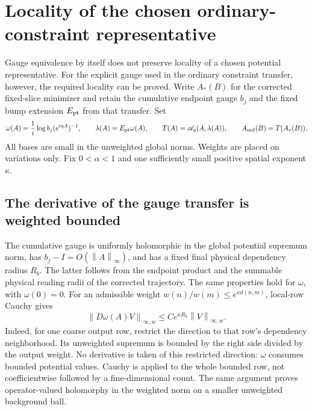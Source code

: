 \documentclass[11pt]{article}
\theoremstyle{remark}
\newcommand{\norm}[1]{\left\|#1\right\|}
\begin{document}

\section{Locality of the chosen ordinary-constraint representative}
\label{or-section}

Gauge equivalence by itself does not preserve locality of a chosen
potential representative. For the explicit gauge used in the ordinary
constraint transfer, however, the required locality can be proved.
Write $A_*(B)$ for the corrected fixed-slice minimizer and retain the
cumulative endpoint gauge $b_j$ and the fixed bump extension
$E_{\rm pt}$ from that transfer. Set
\begin{equation}\label{or-transfer}
 \omega(A)=\frac1i\log b_j(e^{i\eta A})^{-1},\qquad
 \lambda(A)=E_{\rm pt}\omega(A),\qquad
 T(A)=\mathscr A_\eta(A,\lambda(A)),\qquad
 A_{\rm ord}(B)=T(A_*(B)).
\end{equation}
All bases are small in the unweighted global norms. Weights are
placed on variations only. Fix $0<\alpha<1$ and one sufficiently
small positive spatial exponent $\kappa$.

\subsection{The derivative of the gauge transfer is weighted bounded}

The cumulative gauge is uniformly holomorphic in the global
potential supremum norm, has $b_j-I=O(\norm{A}_\infty)$,
and has a fixed final physical dependency radius $R_b$.
The latter follows from the endpoint product and the summable
physical reading radii of the corrected trajectory.
The same properties hold for $\omega$, with $\omega(0)=0$.
For an admissible weight $w(n)/w(m)\le e^{\kappa d(n,m)}$,
local-row Cauchy gives
\begin{equation}\label{or-omega-derivative}
 \norm{D\omega(A)V}_{\infty,w}
      \le C e^{\kappa R_b}\norm{V}_{\infty,w}.
\end{equation}
Indeed, for one coarse output row, restrict the direction to that
row's dependency neighborhood. Its unweighted supremum is bounded
by the right side divided by the output weight. No derivative is
taken of this restricted direction: $\omega$ consumes bounded
potential values. Cauchy is applied to the whole bounded row,
not coefficientwise followed by a fine-dimensional count.
The same argument proves operator-valued holomorphy in the
weighted norm on a smaller unweighted background ball.
\end{document}
